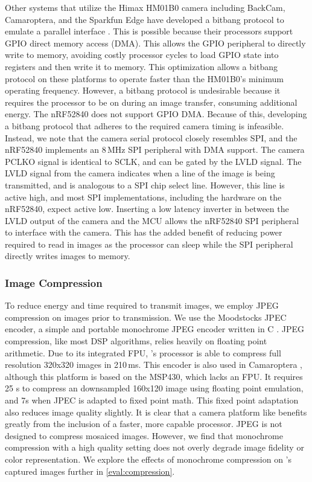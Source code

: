 Other systems that utilize the Himax HM01B0 camera including BackCam, Camaroptera, and the Sparkfun Edge have developed a bitbang protocol to emulate a parallel interface \cite{josephson2019wireless, nardello2019camaroptera, sparkfunedge}. This is possible because their processors support GPIO direct memory access (DMA). This allows the GPIO peripheral to directly write to memory, avoiding costly processor cycles to load GPIO state into registers and then write it to memory. This optimization allows a bitbang protocol on these platforms to operate faster than the HM01B0's minimum operating frequency. However, a bitbang protocol is undesirable because it requires the processor to be on during an image transfer, consuming additional energy. The nRF52840 does not support GPIO DMA. 
Because of this, developing a bitbang protocol that adheres to the required camera timing is infeasible. 
Instead, we note that the camera serial protocol closely resembles SPI, and the nRF52840 implements an 8\,MHz SPI peripheral with DMA support. 
The camera PCLKO signal is identical to SCLK, and can be gated by the LVLD signal. 
The LVLD signal from the camera indicates when a line of the image is being transmitted, and is analogous to a SPI chip select line. However, this line is active high, and most SPI implementations, including the hardware on the nRF52840, expect active low. Inserting a low latency inverter in between the LVLD output of the camera and the MCU allows the nRF52840 SPI peripheral to interface with the camera. 
This has the added benefit of reducing power required to read in images as the processor can sleep while the SPI peripheral directly writes images to memory.


\subsubsection{Image Compression}
To reduce energy and time required to transmit images, we employ JPEG compression on images prior to transmission. We use the Moodstocks JPEC encoder, a simple and portable monochrome JPEG encoder written in C \cite{moodstocks}. JPEG compression, like most DSP algorithms, relies heavily on floating point arithmetic. Due to its integrated FPU, \namec{}'s processor is able to compress full resolution 320x320 images in 210\,ms.
This encoder is also used in Camaroptera \cite{nardello2019camaroptera}, although this platform is based on the MSP430, which lacks an FPU. It requires 25 s to compress an downsampled 160x120 image using floating point emulation, and 7s when JPEC is adapted to fixed point math. This fixed point adaptation also reduces image quality slightly. It is clear that a camera platform like \namec{} benefits greatly from the inclusion of a faster, more capable processor.
JPEG is not designed to compress mosaiced images. However, we find that monochrome compression with a high quality setting does not overly degrade image fidelity or color representation. We explore the effects of monochrome compression on \namec's captured images further in \cref{eval:compression}.

